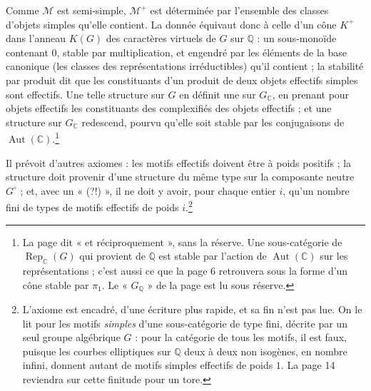 \documentclass[11pt,a4paper]{article}
\begin{document}
Comme $\mathcal{M}$ est semi-simple, $\mathcal{M}^{+}$ est déterminée par
l'ensemble des classes d'objets simples qu'elle contient. La donnée équivaut
donc à celle d'un cône $K^{+}$ dans l'anneau $K(G)$ des caractères virtuels de
$G$ sur $\mathbb{Q}$ : un sous-monoïde contenant $0$, stable par
multiplication, et engendré par les éléments de la base canonique (les
classes des représentations irréductibles) qu'il contient ; la stabilité
par produit dit que les constituants d'un produit de deux objets effectifs
simples sont effectifs. Une telle structure sur $G$ en définit une sur
$G_{\mathbb{C}}$, en prenant pour objets effectifs les constituants des
complexifiés des objets effectifs ; et une structure sur $G_{\mathbb{C}}$
redescend, pourvu qu'elle soit stable par les conjugaisons de
$\operatorname{Aut}(\mathbb{C})$.\footnote{La page dit « et réciproquement »,
sans la réserve. Une sous-catégorie de $\operatorname{Rep}_{\mathbb{C}}(G)$ qui
provient de $\mathbb{Q}$ est stable par l'action de
$\operatorname{Aut}(\mathbb{C})$ sur les représentations ; c'est aussi ce que
la page 6 retrouvera sous la forme d'un cône stable par $\pi_{1}$. Le
« $G_{\mathbb{Q}}$ » de la page est lu sous réserve.}

Il prévoit d'autres axiomes : les motifs effectifs doivent être à poids
positifs ; la structure doit provenir d'une structure du même type sur la
composante neutre $G^{\circ}$ ; et, avec un « (?!) », il ne doit y avoir, pour
chaque entier $i$, qu'un nombre fini de types de motifs effectifs de poids
$i$.\footnote{L'axiome est encadré, d'une écriture plus rapide, et sa fin n'est
pas lue. On le lit pour les motifs \emph{simples} d'une sous-catégorie de type
fini, décrite par un seul groupe algébrique $G$ : pour la catégorie de tous les
motifs, il est faux, puisque les courbes elliptiques sur $\mathbb{Q}$ deux à
deux non isogènes, en nombre infini, donnent autant de motifs simples effectifs
de poids $1$. La page 14 reviendra sur cette finitude pour un tore.}
\end{document}
